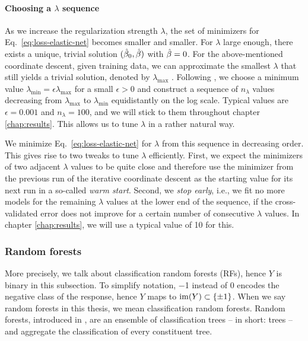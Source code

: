 \paragraph{Choosing a $\lambda$ sequence}
As we increase the regularization strength $\lambda$, the set of minimizers for
Eq.\ \eqref{eq:loss-elastic-net} becomes smaller and smaller. For $\lambda$ large enough, there exists 
a unique, trivial solution $(\hat{\beta}_0, \hat{\beta})$ with $\hat{\beta} = 0$. For the above-mentioned 
coordinate descent, given 
training data, we can approximate the smallest $\lambda$ that still yields a 
trivial solution, denoted by $\lambda_\text{max}$ \cite[section 3.3]{rehberg-thesis18}. Following 
\cite[section 2.5]{regularization-path10}, we choose a minimum value $\lambda_\text{min} = 
\epsilon \lambda_\text{max}$ for a small $\epsilon > 0$ and 
construct a sequence of $n_\lambda$ values decreasing from $\lambda_\text{max}$ to 
$\lambda_\text{min}$ equidistantly on the log scale. Typical values are $\epsilon = \num{0.001}$ and
$n_\lambda = \num{100}$, and we will stick to them throughout chapter \ref{chap:results}. This 
allows us to tune $\lambda$ in a rather natural way.

We minimize Eq.\ \eqref{eq:loss-elastic-net} for $\lambda$ from this sequence in decreasing order. This gives rise 
to two tweaks to tune $\lambda$ efficiently. First, we expect the minimizers of two adjacent $\lambda$ 
values to be quite close and therefore use the minimizer from the previous run of the iterative coordinate 
descent as the starting value for its next run in a so-called \textit{warm start}. Second, we 
\textit{stop early}, i.e., we fit no more models for the remaining $\lambda$ values at the lower end of the 
sequence, if the cross-validated error does not improve for a certain number of consecutive 
$\lambda$ values. In chapter \ref{chap:results}, we will use a typical value of \num{10} for this.

\subsubsection{Random forests}

More precisely, we talk about classification random forests (RFs), hence $Y$ is binary in this 
subsection. To simplify notation, \num{-1} instead of \num{0} encodes the negative class of 
the response, hence $Y$ maps to $\mathrm{im}(Y) \subset \{ \pm 1 \}$. When we say random 
forests in this thesis, we mean classification 
random forests. Random forests, introduced in \cite{breiman01}, are an ensemble of classification 
trees -- in short: trees -- and aggregate the classification of every constituent tree.

